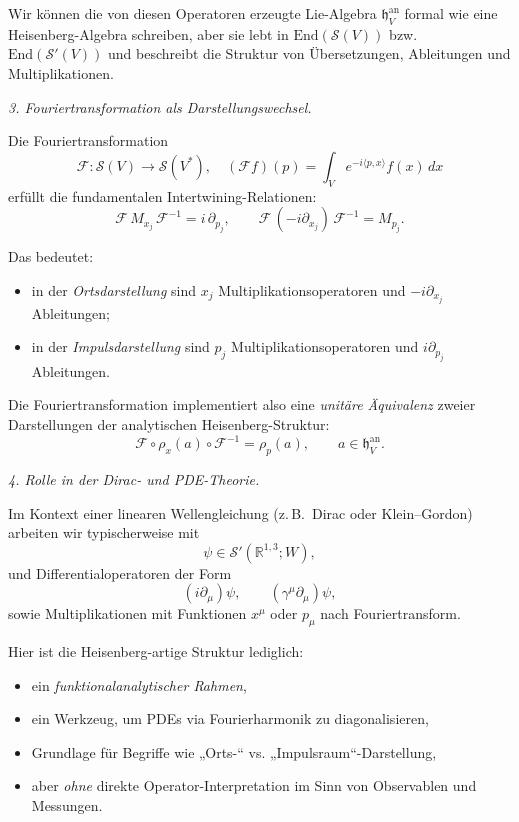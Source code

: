 \documentclass[10pt, letterpaper]{article}
\newcommand{\R}{\mathbb{R}}
\newcommand{\End}{\mathrm{End}}
\begin{document}
Wir können die von diesen Operatoren erzeugte Lie-Algebra
\(\mathfrak{h}^{\mathrm{an}}_V\) formal wie eine Heisenberg-Algebra schreiben,
aber sie lebt in \(\End(\mathcal{S}(V))\) bzw.\ \(\End(\mathcal{S}'(V))\)
und beschreibt die Struktur von Übersetzungen, Ableitungen und Multiplikationen.

\emph{3. Fouriertransformation als Darstellungswechsel.}

Die Fouriertransformation
\[
\mathcal{F}:\mathcal{S}(V)\to\mathcal{S}(V^\ast),\quad
(\mathcal{F}f)(p) = \int_V e^{-i\langle p,x\rangle}f(x)\,dx
\]
erfüllt die fundamentalen Intertwining-Relationen:
\[
\mathcal{F}\,M_{x_j}\,\mathcal{F}^{-1} = i\,\partial_{p_j},\qquad
\mathcal{F}\,(-i\partial_{x_j})\,\mathcal{F}^{-1} = M_{p_j}.
\]

Das bedeutet:
\begin{itemize}
  \item in der \emph{Ortsdarstellung} sind \(x_j\) Multiplikationsoperatoren
        und \(-i\partial_{x_j}\) Ableitungen;
  \item in der \emph{Impulsdarstellung} sind \(p_j\) Multiplikationsoperatoren
        und \(i\partial_{p_j}\) Ableitungen.
\end{itemize}

Die Fouriertransformation implementiert also eine \emph{unitäre Äquivalenz}
zweier Darstellungen der analytischen Heisenberg-Struktur:
\[
\mathcal{F}\circ \rho_x(a)\circ\mathcal{F}^{-1} = \rho_p(a),\qquad a\in\mathfrak{h}^{\mathrm{an}}_V.
\]

\emph{4. Rolle in der Dirac- und PDE-Theorie.}

Im Kontext einer linearen Wellengleichung (z.\,B.\ Dirac oder Klein–Gordon)
arbeiten wir typischerweise mit
\[
\psi\in\mathcal{S}'(\R^{1,3};W),
\]
und Differentialoperatoren der Form
\[
(i\partial_\mu)\psi,\qquad
(\gamma^\mu\partial_\mu)\psi,
\]
sowie Multiplikationen mit Funktionen \(x^\mu\) oder \(p_\mu\) nach Fouriertransform.

Hier ist die Heisenberg-artige Struktur lediglich:
\begin{itemize}
  \item ein \emph{funktionalanalytischer Rahmen},
  \item ein Werkzeug, um PDEs via Fourierharmonik zu diagonalisieren,
  \item Grundlage für Begriffe wie „Orts-“ vs. „Impulsraum“-Darstellung,
  \item aber \emph{ohne} direkte Operator-Interpretation im Sinn von Observablen und Messungen.
\end{itemize}
\end{document}
